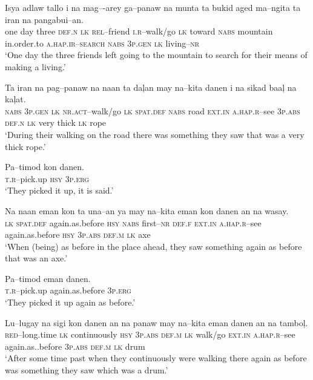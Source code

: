 \ea
\gll Isya  adlaw  tallo  i  na  mag--{}-arey  ga--panaw   na  munta  ta  bukid  aged  ma--ngita   ta  iran  na  pangabui--an. \\
one  day  three  \textsc{def.n}  \textsc{lk}  \textsc{rel}--friend  \textsc{i.r}--walk/go
\textsc{lk}  toward  \textsc{nabs}  mountain  in.order.to  \textsc{a.hap.ir--search}
\textsc{nabs}  \textsc{3}\textsc{p.gen}  \textsc{lk}  living--\textsc{nr} \\
\glt ‘One day the three friends left going to the mountain to search for their means of making a living.’
\z

\ea
\gll  Ta  iran  na  pag--panaw  na  naan  ta  da\c{l}an   may  na--kita  danen  i  na  sikad  baa\c{l}  na  ka\c{l}at. \\
\textsc{nabs}  3\textsc{p.gen}  \textsc{lk}  \textsc{nr.act}--walk/go  \textsc{lk}  \textsc{spat.def}  \textsc{nabs}  road
\textsc{ext.in}  \textsc{a.hap.r}--see  3\textsc{p.abs}  \textsc{def.n}  \textsc{lk}  very  thick  \textsc{lk}  rope \\
\glt ‘During their walking on the road there was something they saw that was a very thick rope.’
\z

\ea
\gll  Pa--timod  kon  danen. \\
\textsc{t.r}--pick.up  \textsc{hsy}  3\textsc{p.erg} \\
\glt ‘They picked it up, it is said.’
\z

\ea
\gll Na  naan  eman  kon  ta  una--an  ya  may  na--kita   eman  kon  danen  an  na  wasay. \\
\textsc{lk}  \textsc{spat.def}  again.as.before  \textsc{hsy}  \textsc{nabs}  first--\textsc{nr}  \textsc{def.f}  \textsc{ext.in}  \textsc{a.hap.r}--see
again.as.before  \textsc{hsy}  3\textsc{p.abs}  \textsc{def.m}  \textsc{lk}  axe \\
\glt ‘When (being) as before in the place ahead, they saw something again as before that was an axe.’
\z

\ea
\gll  Pa--timod  eman  danen. \\
\textsc{t.r}--pick.up  again.as.before  3\textsc{p.erg} \\
\glt ‘They picked it up again as before.’
\z

\ea
\gll  Lu--lugay  na  sigi  kon  danen  an  na  panaw  may   na--kita  eman  danen  an  na  tambo\c{l}. \\
\textsc{red}--long.time  \textsc{lk}  continuously  \textsc{hsy}  3\textsc{p.abs}  \textsc{def.m}  \textsc{lk}  walk/go  \textsc{ext.in}
\textsc{a.hap.r}--see  again.as..before  3\textsc{p.abs}  \textsc{def.m}  \textsc{lk}  drum \\
\glt ‘After some time past when they continuously were walking there again as before was something they saw which was a drum.’
\z


